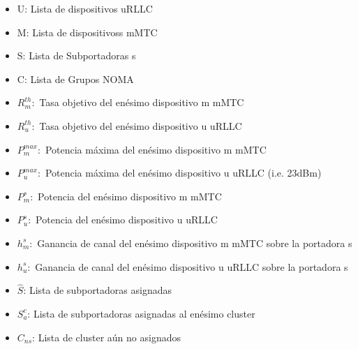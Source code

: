 \begin{itemize}
    \item U: Lista de dispositivos uRLLC
    \item M: Lista de dispositivoss mMTC
    \item S: Lista de Subportadoras s
    \item C: Lista de Grupos NOMA
    \item $R_{m}^{th}:$ Tasa objetivo del enésimo dispositivo m mMTC 
    \item $R_{u}^{th}:$ Tasa objetivo del enésimo dispositivo u uRLLC
    \item $P_{m}^{max}:$ Potencia máxima del enésimo dispositivo m mMTC 
    \item $P_{u}^{max}:$ Potencia máxima del enésimo dispositivo u uRLLC (i.e. 23dBm)
    \item $P_{m}^{s}:$ Potencia del enésimo dispositivo m mMTC 
    \item $P_{u}^{s}:$ Potencia del enésimo dispositivo u uRLLC 
    \item $h_{m}^{s}:$ Ganancia de canal del enésimo dispositivo m mMTC sobre la portadora s
    \item $h_{u}^{s}:$ Ganancia de canal del enésimo dispositivo u uRLLC sobre la portadora s
    \item ${\hat S}$: Lista de subportadoras asignadas
    \item $S_{a}^{c}$: Lista de subportadoras asignadas al enésimo cluster
    \item ${C_{ns}}$: Lista de cluster aún no asignados
\end{itemize}


\makeatletter
\def\algbackskip{\hskip-\ALG@thistlm}
\makeatother

